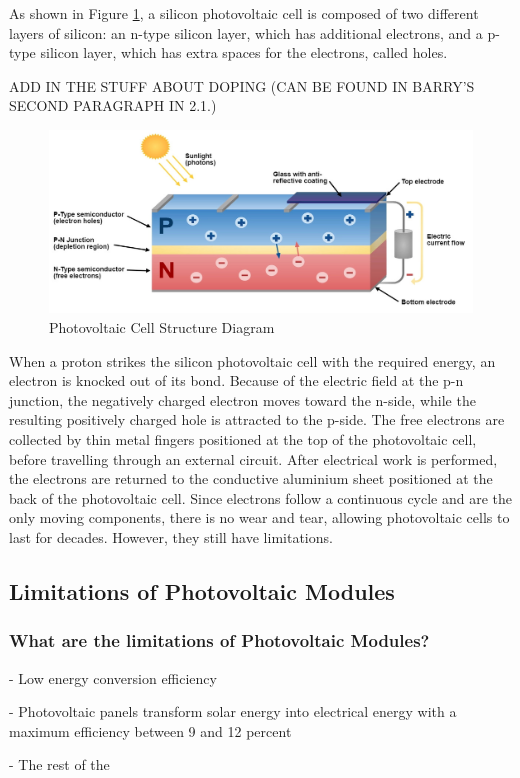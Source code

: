 \noindent As shown in Figure \ref{fig:photovoltaic_cell_diagram}, a silicon photovoltaic cell is composed of two different layers of silicon: an n-type silicon layer, which has additional electrons, and a p-type silicon layer, which has extra spaces for the electrons, called holes.\par

ADD IN THE STUFF ABOUT DOPING (CAN BE FOUND IN BARRY'S SECOND PARAGRAPH IN 2.1.)

\begin{figure}[ht]
    \centering
    \includegraphics[width=1\textwidth]{Figures/photovoltaic_cell_diagram.jpg}
    \caption{Photovoltaic Cell Structure Diagram}
    \label{fig:photovoltaic_cell_diagram}
\end{figure}
\FloatBarrier

\noindent When a proton strikes the silicon photovoltaic cell with the required energy, an electron is knocked out of its bond. Because of the electric field at the p-n junction, the negatively charged electron moves toward the n-side, while the resulting positively charged hole is attracted to the p-side. The free electrons are collected by thin metal fingers positioned at the top of the photovoltaic cell, before travelling through an external circuit. After electrical work is performed, the electrons are returned to the conductive aluminium sheet positioned at the back of the photovoltaic cell. Since electrons follow a continuous cycle and are the only moving components, there is no wear and tear, allowing photovoltaic cells to last for decades. However, they still have limitations.\vspace{0.5em}

\subsection{Limitations of Photovoltaic Modules}
\subsubsection{What are the limitations of Photovoltaic Modules?}
- Low energy conversion efficiency\par
- Photovoltaic panels transform solar energy into electrical energy with a maximum efficiency between 9 and 12 percent\par
- The rest of the 

